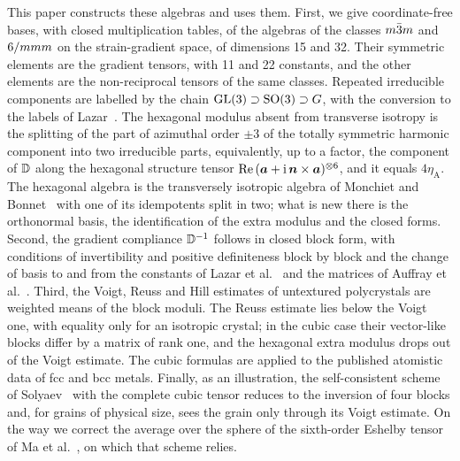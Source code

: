This paper constructs these algebras and uses them. First, we give coordinate-free bases,
with closed multiplication tables, of the algebras of the classes $m\bar{3}m$ and $6/mmm$
on the strain-gradient space, of dimensions 15 and 32. Their symmetric elements are the
gradient tensors, with 11 and 22 constants, and the other elements are the
non-reciprocal tensors of the same classes. Repeated irreducible components are labelled
by the chain $\mathrm{GL}(3)\supset\mathrm{SO}(3)\supset G$, with the conversion to the labels of
Lazar~\cite{Lazar2016}. The hexagonal modulus absent from transverse isotropy is the
splitting of the part of azimuthal order $\pm3$ of the totally symmetric harmonic
component into two irreducible parts, equivalently, up to a factor, the component of
$\mathbb{D}$ along the hexagonal structure tensor $\mathrm{Re}\,(\bm a+\mathrm{i}\,\bm n\times\bm a)^{\otimes6}$, and it
equals $4\eta_{\mathrm A}$. The hexagonal algebra is the transversely isotropic algebra of
Monchiet and Bonnet~\cite{Monchiet2013} with one of its idempotents split in two; what is
new there is the orthonormal basis, the identification of the extra modulus and the closed
forms. Second, the gradient compliance $\mathbb{D}^{-1}$ follows in closed block form,
with conditions of invertibility and positive definiteness block by block and the change of basis to and from the constants of Lazar et
al.~\cite{Lazar2022} and the matrices of Auffray et al.~\cite{Auffray2013}. Third, the
Voigt, Reuss and Hill estimates of untextured polycrystals are weighted means of the
block moduli. The Reuss estimate lies below the Voigt one, with equality only for an
isotropic crystal; in the cubic case their vector-like blocks differ by a matrix of rank
one, and the hexagonal extra modulus drops out of the Voigt estimate. The cubic formulas
are applied to the published atomistic data of fcc and bcc metals. Finally, as an illustration, the self-consistent
scheme of Solyaev~\cite{Solyaev2023} with the complete cubic tensor reduces to the
inversion of four blocks and, for grains of physical size, sees the grain only through
its Voigt estimate. On the way we correct the average over the sphere of the sixth-order
Eshelby tensor of Ma et al.~\cite{Ma2018}, on which that scheme relies.

